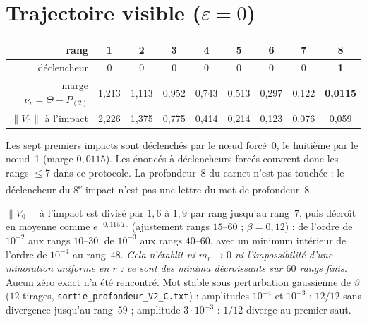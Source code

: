 \documentclass[11pt,a4paper]{article}
\theoremstyle{remark}
\newcommand{\norm}[1]{\lVert #1\rVert}
\newcommand{\vth}{\vartheta}
\begin{document}
\section{Trajectoire visible ($\varepsilon=0$)}
\begin{center}\small
\begin{tabular}{r|cccccccc}
\toprule
rang & 1 & 2 & 3 & 4 & 5 & 6 & 7 & 8\\
\midrule
d\'eclencheur & 0&0&0&0&0&0&0&\textbf{1}\\
marge $\nu_r=\Theta-P_{(2)}$ & 1,213 & 1,113 & 0,952 & 0,743 & 0,513 & 0,297 & 0,122 & \textbf{0,0115}\\
$\norm{V_0}$ \`a l'impact & 2,226 & 1,375 & 0,775 & 0,414 & 0,214 & 0,123 & 0,076 & 0,059\\
\bottomrule
\end{tabular}
\end{center}
Les sept premiers impacts sont d\'eclench\'es par le n\oe ud forc\'e~0, le huiti\`eme par le n\oe ud~1 (marge $0{,}0115$). Les \'enonc\'es \`a d\'eclencheurs forc\'es couvrent donc les rangs $\le7$ dans ce protocole. La profondeur~8 du carnet n'est pas touch\'ee : le d\'eclencheur du 8\textsuperscript{e} impact n'est pas une lettre du mot de profondeur~8.

$\norm{V_0}$ \`a l'impact est divis\'e par $1{,}6$ \`a $1{,}9$ par rang jusqu'au rang~7, puis d\'ecro\^{\i}t en moyenne comme $e^{-0{,}115\,T_r}$ (ajustement rangs $15$--$60$ ; $\beta=0{,}12$) : de l'ordre de $10^{-2}$ aux rangs $10$--$30$, de $10^{-3}$ aux rangs $40$--$60$, avec un minimum int\'erieur de l'ordre de $10^{-4}$ au rang~48. \emph{Cela n'\'etablit ni $m_r\to0$ ni l'impossibilit\'e d'une minoration uniforme en $r$ : ce sont des minima d\'ecroissants sur $60$ rangs finis.} Aucun z\'ero exact n'a \'et\'e rencontr\'e. Mot stable sous perturbation gaussienne de $\vth$ ($12$ tirages, \texttt{sortie\_profondeur\_V2\_C.txt}) : amplitudes $10^{-4}$ et $10^{-3}$ : $12/12$ sans divergence jusqu'au rang~$59$ ; amplitude $3\cdot10^{-3}$ : $1/12$ diverge au premier saut.
\end{document}
